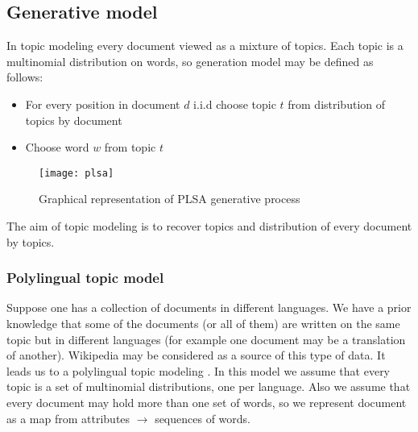    \subsection{Generative model}
\label{generativeModel}
    In topic modeling every document viewed as a mixture of topics. Each topic is a multinomial distribution on words,
    so generation model may be defined as follows:
    \begin{itemize} \label{generation}
	\item For every position in document $d$ i.i.d choose topic $t$ from distribution of topics by document
	\item Choose word $w$ from topic $t$
    \end{itemize}
    \begin{figure}[!ht]
	\caption{Graphical representation of PLSA generative process}
	\begin{minipage}{\textwidth}
	    \texttt{[image: plsa]}
	\end{minipage}
    \end{figure}
    The aim of topic modeling is to recover topics and distribution of every document by topics.
    \subsubsection{Polylingual topic model}
	Suppose one has a collection of documents in different languages. We have a prior knowledge that some of the
	documents (or all of them) are written on the same topic but in different languages (for example one document may be a translation of another).
	Wikipedia may be considered as a source of this type of data. It leads us to a polylingual topic modeling \cite{polylingual}.
	In this model we assume that every topic is a set of multinomial distributions, one per language. Also we assume that
	every document may hold more than one set of words, so we represent document as a map from attributes $\to$  sequences of words.

